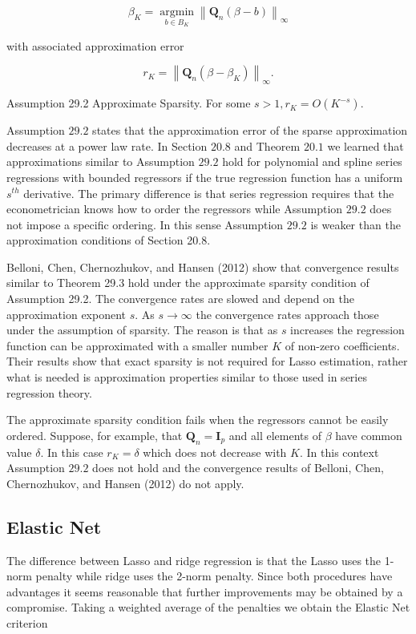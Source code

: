 \documentclass[10pt]{article}
\begin{document}
$$
\beta_{K}=\underset{b \in B_{K}}{\operatorname{argmin}}\left\|\boldsymbol{Q}_{n}(\beta-b)\right\|_{\infty}
$$

with associated approximation error

$$
r_{K}=\left\|\boldsymbol{Q}_{n}\left(\beta-\beta_{K}\right)\right\|_{\infty} .
$$

Assumption 29.2 Approximate Sparsity. For some $s>1, r_{K}=O\left(K^{-s}\right)$.

Assumption $29.2$ states that the approximation error of the sparse approximation decreases at a power law rate. In Section $20.8$ and Theorem $20.1$ we learned that approximations similar to Assumption $29.2$ hold for polynomial and spline series regressions with bounded regressors if the true regression function has a uniform $s^{t h}$ derivative. The primary difference is that series regression requires that the econometrician knows how to order the regressors while Assumption $29.2$ does not impose a specific ordering. In this sense Assumption $29.2$ is weaker than the approximation conditions of Section 20.8.

Belloni, Chen, Chernozhukov, and Hansen (2012) show that convergence results similar to Theorem 29.3 hold under the approximate sparsity condition of Assumption 29.2. The convergence rates are slowed and depend on the approximation exponent $s$. As $s \rightarrow \infty$ the convergence rates approach those under the assumption of sparsity. The reason is that as $s$ increases the regression function can be approximated with a smaller number $K$ of non-zero coefficients. Their results show that exact sparsity is not required for Lasso estimation, rather what is needed is approximation properties similar to those used in series regression theory.

The approximate sparsity condition fails when the regressors cannot be easily ordered. Suppose, for example, that $\boldsymbol{Q}_{n}=\boldsymbol{I}_{p}$ and all elements of $\beta$ have common value $\delta$. In this case $r_{K}=\delta$ which does not decrease with $K$. In this context Assumption $29.2$ does not hold and the convergence results of Belloni, Chen, Chernozhukov, and Hansen (2012) do not apply.

\subsection{Elastic Net}
The difference between Lasso and ridge regression is that the Lasso uses the 1-norm penalty while ridge uses the 2-norm penalty. Since both procedures have advantages it seems reasonable that further improvements may be obtained by a compromise. Taking a weighted average of the penalties we obtain the Elastic Net criterion
\end{document}
